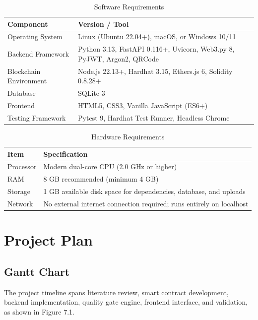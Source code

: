 \documentclass[12pt,a4paper]{report}
\begin{document}
\begin{table}[H]
\centering
\caption{Software Requirements}
\label{tab:sw_req}
\small
\begin{tabularx}{\textwidth}{p{3.5cm} X}
\toprule
\textbf{Component} & \textbf{Version / Tool} \\
\midrule
Operating System & Linux (Ubuntu 22.04+), macOS, or Windows 10/11 \\
Backend Framework & Python 3.13, FastAPI 0.116+, Uvicorn, Web3.py 8, PyJWT, Argon2, QRCode \\
Blockchain Environment & Node.js 22.13+, Hardhat 3.15, Ethers.js 6, Solidity 0.8.28+ \\
Database & SQLite 3 \\
Frontend & HTML5, CSS3, Vanilla JavaScript (ES6+) \\
Testing Framework & Pytest 9, Hardhat Test Runner, Headless Chrome \\
\bottomrule
\end{tabularx}
\end{table}

\begin{table}[H]
\centering
\caption{Hardware Requirements}
\label{tab:hw_req}
\small
\begin{tabularx}{\textwidth}{p{3.5cm} X}
\toprule
\textbf{Item} & \textbf{Specification} \\
\midrule
Processor & Modern dual-core CPU (2.0 GHz or higher) \\
RAM & 8 GB recommended (minimum 4 GB) \\
Storage & 1 GB available disk space for dependencies, database, and uploads \\
Network & No external internet connection required; runs entirely on localhost \\
\bottomrule
\end{tabularx}
\end{table}

\chapter{Project Plan}

\section{Gantt Chart}
The project timeline spans literature review, smart contract development, backend implementation, quality gate engine, frontend interface, and validation, as shown in Figure 7.1.
\end{document}
